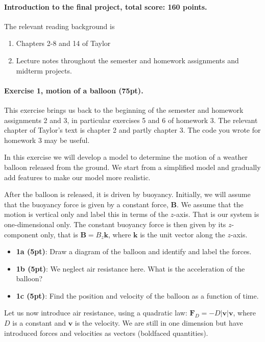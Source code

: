 \documentclass[%
oneside,                 %
final,                   %
10pt]{article}
\begin{document}
\noindent
\paragraph{Introduction to the final project, total score: 160  points.}
The relevant reading background is
\begin{enumerate}
\item Chapters 2-8 and 14 of Taylor

\item Lecture notes throughout the semester and homework assignments and midterm projects.
\end{enumerate}

\noindent
\paragraph{Exercise 1, motion of a balloon (75pt).}
This exercise brings us back to the beginning of the semester and
homework assignments 2 and 3, in particular exercises 5 and 6 of
homework 3. The relevant chapter of Taylor's text is chapter 2 and
partly chapter 3. The code you wrote for homework 3 may be useful.

In this exercise we will develop a model to determine the motion of a
weather balloon released from the ground. We start from a simplified
model and gradually add features to make our model more realistic.

After the balloon is released, it is driven by buoyancy. Initially, we will assume that the buoyancy force is given by a constant force, $\bm{B}$.
We assume that the motion is vertical only and label this in terms of the $z$-axis.  That is our system is one-dimensional only.
The constant buoyancy force is then given by its $z$-component only, that is $\bm{B}=B_z\bm{k}$, where $\bm{k}$ is the unit vector along the $z$-axis.
\begin{itemize}
\item \textbf{1a (5pt)}: Draw a diagram of the balloon and identify and label the forces. 

\item \textbf{1b (5pt)}: We neglect air resistance here. What is the acceleration of the balloon?

\item \textbf{1c (5pt)}: Find the position and velocity of the balloon as a function of time.
\end{itemize}

\noindent
Let us now introduce air resistance, using a quadratic law: $\bm{F}_D
= −D \vert \bm{v}\vert \bm{v}$, where $D$ is a constant and $\bm{v}$
is the velocity. We are still in one dimension but have introduced
forces and velocities as vectors (boldfaced quantities).
\end{document}
